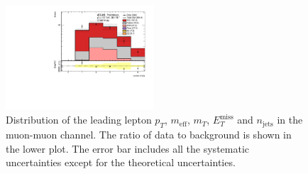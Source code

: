 \begin{figure}[htbp]
\begin{center}
\includegraphics[width=0.49\textwidth]{data/plot/DataFakes/FakeEff/IntNote_nJets_mumu.pdf}
\end{center}
\caption{Distribution of the  leading lepton $p_T$, $m_{\text{eff}}$, $m_T$, $E_{T}^{\text{miss}}$ and $n_{\text{jets}}$ in the muon-muon channel. The ratio of data to background is shown in the lower plot. The error bar includes all the systematic uncertainties except for the theoretical uncertainties.}
\label{fig:VRSS_fake_mumu}
\end{figure}

